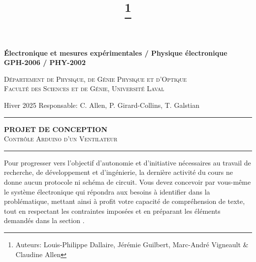 \documentclass[english,french,12pt]{article}
\title{\vspace{-7em}\thanks{Auteurs: Louis-Philippe Dallaire, Jérémie Guilbert, Marc-André Vigneault \& Claudine Allen}}
\date{}
\begin{document}
\maketitle\thispagestyle{fancy}
%
%
\begin{center}
    \textbf{\large{Électronique et mesures expérimentales / Physique électronique}}\\
    \vspace{0.2em}
    \textbf{GPH-2006 / PHY-2002}

    \textsc{Département de Physique, de Génie Physique et d'Optique\\
    Faculté des Sciences et de Génie, Université Laval}
\end{center}

\vspace{-1em}
\noindent Hiver 2025 \hfill Responsable: C. Allen, P. Girard-Collins, T. Galstian\par
\vspace{0.2ex}
\hrule
\vspace{0.5ex}
\centering
    \textbf{PROJET DE CONCEPTION}\\
    \textsc{Contrôle Arduino d'un Ventilateur}\par
\vspace{2ex}
\hrule
\justify
\vspace{-1ex}
Pour progresser vers l'objectif d'autonomie et d'initiative nécessaires au travail de recherche, de développement et d'ingénierie, la dernière activité du cours ne donne aucun protocole ni schéma de circuit. Vous devez concevoir par vous-même le système électronique qui répondra aux besoins à identifier dans la problématique, mettant ainsi à profit votre capacité de compréhension de texte, tout en respectant les contraintes imposées et en préparant les éléments demandés dans la section . 

\end{document}
